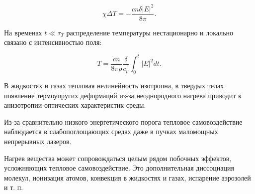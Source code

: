 \documentclass[a4paper, 12pt]{article}
\begin{document}
\begin{equation}
\chi \Delta T = -\frac{c n \delta |E|^2}{8\pi}.
\label{eq:1.40}
\end{equation}

На временах \( t \ll \tau_T \) распределение температуры нестационарно и локально связано с интенсивностью поля:

\begin{equation}
T = \frac{c n}{8\pi\rho} \frac{\delta}{c_p} \int_0^t |E|^2  dt.
\label{eq:1.41}
\end{equation}

В жидкостях и газах тепловая нелинейность изотропна, в твердых телах появление термоупругих деформаций из-за неоднородного нагрева приводит к анизотропии оптических характеристик среды.

Из-за сравнительно низкого энергетического порога тепловое самовоздействие наблюдается в слабопоглощающих средах даже в пучках маломощных непрерывных лазеров.

Нагрев вещества может сопровождаться целым рядом побочных эффектов, усложняющих тепловое самовоздействие. Это дополнительная диссоциация молекул, ионизация атомов, конвекция в жидкостях и газах, испарение аэрозолей и т. п.
\end{document}
